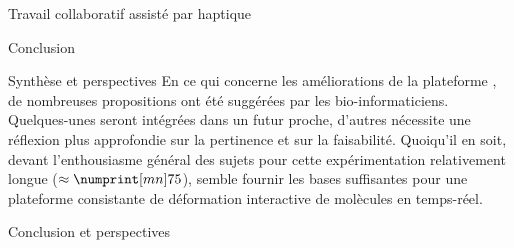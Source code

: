 \documentclass[myfrancais,ngerman,english,frenchb]{mythesis}
\begin{document}
\begin{mychapter}{Travail collaboratif assisté par haptique}
\begin{mysection}{Conclusion}
\begin{mysubsection}{Synthèse et perspectives}
				En ce qui concerne les améliorations de la plateforme \myShaddock, de nombreuses propositions ont été suggérées par les bio-informaticiens.
				Quelques-unes seront intégrées dans un futur proche, d'autres nécessite une réflexion plus approfondie sur la pertinence et sur la faisabilité.
				Quoiqu'il en soit, devant l'enthousiasme général des sujets pour cette expérimentation relativement longue ($\approx \mynum[mn]{75}$), \myShaddock semble fournir les bases suffisantes pour une plateforme consistante de déformation interactive de molècules en temps-réel.
			\end{mysubsection}
		\end{mysection}
	\end{mychapter}
	\begin{mychapter+}{Conclusion et perspectives}
	\end{mychapter+}
	\mybiblio%
	\myglossary
	\myappendix
\end{document}
